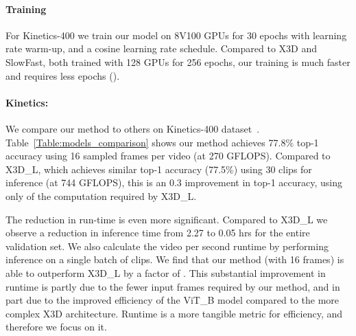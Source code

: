\documentclass[10pt,twocolumn,letterpaper]{article}
\begin{document}
\paragraph{Training} For Kinetics-400 we train our model on 8V100 GPUs for 30 epochs with learning rate warm-up, and a cosine learning rate schedule.
Compared to X3D and SlowFast, both trained with 128 GPUs for 256 epochs, our training is much faster and requires less epochs (). 

\paragraph{Kinetics:} We compare our method to others on Kinetics-400 dataset~\cite{kinetics}. Table~\ref{Table:models_comparison} shows our method achieves 77.8\% top-1 accuracy using 16 sampled frames per video (at 270 GFLOPS). Compared to X3D\_L, which achieves similar top-1 accuracy (77.5\%) using 30 clips for inference (at 744 GFLOPS), this is an 0.3 improvement in top-1 accuracy, using only  of the computation required by X3D\_L.  

The reduction in run-time is even more significant.  Compared to X3D\_L we observe a reduction in inference time from 2.27 to 0.05 hrs for the entire validation set. We also calculate the video per second runtime by performing inference on a single batch of clips.  We find that our method (with 16 frames) is able to outperform X3D\_L by a factor of . This substantial improvement in runtime is partly due to the fewer input frames required by our method, and in part due to the improved efficiency of the ViT\_B model compared to the more complex X3D architecture.  Runtime is a more tangible metric for efficiency, and therefore we focus on it.
\end{document}
